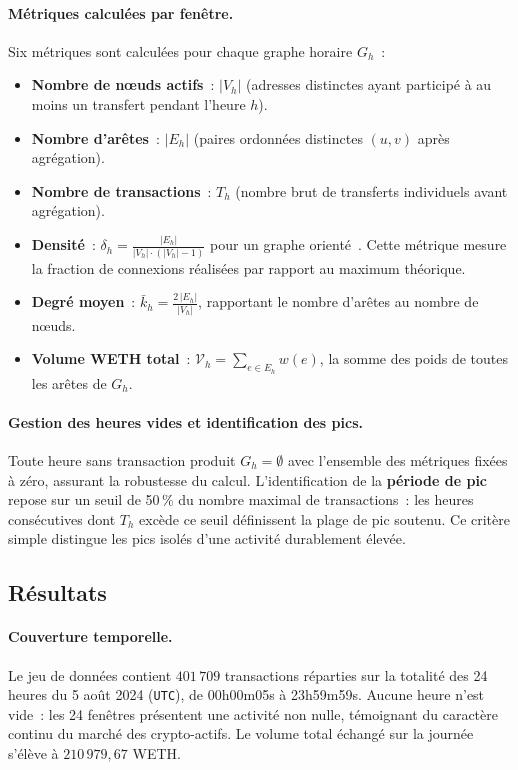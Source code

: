 \paragraph{M\'etriques calcul\'ees par fen\^etre.}
Six m\'etriques sont calcul\'ees pour chaque graphe horaire $G_h$~:
\begin{itemize}
  \item \textbf{Nombre de n\oe{}uds actifs}~: $|V_h|$ (adresses distinctes ayant particip\'e \`a au moins un transfert pendant l'heure $h$).
  \item \textbf{Nombre d'ar\^etes}~: $|E_h|$ (paires ordonn\'ees distinctes $(u, v)$ apr\`es agr\'egation).
  \item \textbf{Nombre de transactions}~: $T_h$ (nombre brut de transferts individuels avant agr\'egation).
  \item \textbf{Densit\'e}~: $\delta_h = \frac{|E_h|}{|V_h| \cdot (|V_h| - 1)}$ pour un graphe orient\'e~\cite{newman2018networks}. Cette m\'etrique mesure la fraction de connexions r\'ealis\'ees par rapport au maximum th\'eorique.
  \item \textbf{Degr\'e moyen}~: $\bar{k}_h = \frac{2\,|E_h|}{|V_h|}$, rapportant le nombre d'ar\^etes au nombre de n\oe{}uds.
  \item \textbf{Volume WETH total}~: $\mathcal{V}_h = \sum_{e \in E_h} w(e)$, la somme des poids de toutes les ar\^etes de $G_h$.
\end{itemize}

\paragraph{Gestion des heures vides et identification des pics.}
Toute heure sans transaction produit $G_h = \emptyset$ avec l'ensemble des m\'etriques fix\'ees \`a z\'ero, assurant la robustesse du calcul. L'identification de la \textbf{p\'eriode de pic} repose sur un seuil de 50\,\% du nombre maximal de transactions~: les heures cons\'ecutives dont $T_h$ exc\`ede ce seuil d\'efinissent la plage de pic soutenu. Ce crit\`ere simple distingue les pics isol\'es d'une activit\'e durablement \'elev\'ee.

\subsection{R\'esultats}
\label{sec:rq4_resultats}

\paragraph{Couverture temporelle.}
Le jeu de donn\'ees contient $401\,709$ transactions r\'eparties sur la totalit\'e des 24 heures du 5 ao\^ut 2024 (\texttt{UTC}), de 00h00m05s \`a 23h59m59s. Aucune heure n'est vide~: les 24 fen\^etres pr\'esentent une activit\'e non nulle, t\'emoignant du caract\`ere continu du march\'e des crypto-actifs. Le volume total \'echang\'e sur la journ\'ee s'\'el\`eve \`a $210\,979{,}67$ WETH.

